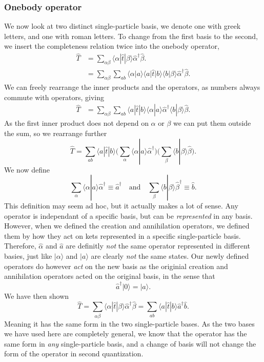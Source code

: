 \documentclass[a4paper, 11pt, notitlepage, english]{article}
\newcommand{\ket}[1]{|#1 \rangle}
\newcommand{\braket}[2]{\langle #1 | #2 \rangle}
\newcommand{\op}[1]{\hat{#1}}
\newcommand{\braopket}[3]{\langle #1 | {#2} | #3 \rangle}
\begin{document}
\subsubsection*{Onebody operator}
We now look at two distinct single-particle basis, we denote one with greek letters, and one with roman letters. To change from the first basis to the second, we insert the completeness relation twice into the onebody operator, 
\begin{align*}
\op{T} &= \sum_{\alpha\beta}\braopket{\alpha}{\op{t}}{\beta}\op{\alpha}^\dag \op{\beta}. \\
&= \sum_{\alpha\beta}\sum_{ab} \braket{\alpha}{a}\braopket{a}{\op{t}}{b}\braket{b}{\beta}\op{\alpha}^\dag \op{\beta}.
\end{align*}
We can freely rearrange the inner products and the operators, as numbers always commute with operators, giving
\begin{align*}
\op{T} &= \sum_{\alpha\beta}\sum_{ab} \braopket{a}{\op{t}}{b}\braket{\alpha}{a}\op{\alpha}^\dag \braket{b}{\beta} \op{\beta}. 
\end{align*}
As the first inner product does not depend on $\alpha$ or $\beta$ we can put them outside the sum, so we rearrange further
$$\op{T} = \sum_{ab} \braopket{a}{\op{t}}{b}\bigg(\sum_\alpha \braket{\alpha}{a}\op{\alpha}^\dag\bigg)\bigg(\sum_\beta \braket{b}{\beta}\op{\beta}\bigg).$$
We now define
$$\sum_\alpha \braket{\alpha}{a}\op{\alpha}^\dag \equiv \op{a}^\dag \quad \mbox{and} \quad \sum_\beta \braket{b}{\beta}\op{\beta}^\dag \equiv \op{b}.$$
This definition may seem ad hoc, but it actually makes a lot of sense. Any operator is independant of a specific basis, but can be \emph{represented} in any basis. However, when we defined the creation and annihilation operators, we defined them by how they act on kets represented in a specific single-particle basis. Therefore, $\op{\alpha}$ and $\op{a}$ are definitly \emph{not} the same operator represented in different basies, just like $\ket{\alpha}$ and $\ket{a}$ are clearly \emph{not} the same states. Our newly defined operators do however \emph{act} on the new basis as the originial creation and annihilation operators acted on the original basis, in the sense that
$$\op{a}^\dag\ket{0} = \ket{a}.$$
We have then shown
$$\op{T} = \sum_{\alpha\beta}\braopket{\alpha}{\op{t}}{\beta}\op{\alpha}^\dag \op{\beta} = \sum_{ab}\braopket{a}{\op{t}}{b}\op{a}^\dag \op{b}.$$
Meaning it has the same form in the two single-particle bases. As the two bases we have used here are completely general, we know that the operator has the same form in \emph{any} single-particle basis, and a change of basis will not change the form of the operator in second quantization.
\end{document}
